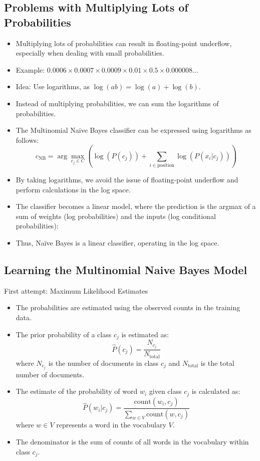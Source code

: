\documentclass{book}
\begin{document}
\subsection{Problems with Multiplying Lots of Probabilities}
\begin{itemize}
    \item Multiplying lots of probabilities can result in floating-point underflow, especially when dealing with small probabilities.
    \item Example: $0.0006 \times 0.0007 \times 0.0009 \times 0.01 \times 0.5 \times 0.000008 \ldots$
    \item Idea: Use logarithms, as $\log(ab) = \log(a) + \log(b)$.
    \item Instead of multiplying probabilities, we can sum the logarithms of probabilities.
    \item The Multinomial Naive Bayes classifier can be expressed using logarithms as follows:
    \[
    c_{\text{NB}} = \arg\max_{c_j \in C} \left(\log(P(c_j)) + \sum_{i \in \text{position}} \log(P(x_i | c_j))\right)
    \]
    \item By taking logarithms, we avoid the issue of floating-point underflow and perform calculations in the log space.
     \item The classifier becomes a linear model, where the prediction is the argmax of a sum of weights (log probabilities) and the inputs (log conditional probabilities):
    \item Thus, Naïve Bayes is a linear classifier, operating in the log space.
    
    
\end{itemize}

\subsection{Learning the Multinomial Naive Bayes Model}
First attempt: Maximum Likelihood Estimates
\begin{itemize}
    \item The probabilities are estimated using the observed counts in the training data.
    \item The prior probability of a class $c_j$ is estimated as:
    \[
    \hat{P}(c_j) = \frac{N_{c_j}}{N_{\text{total}}}
    \]
    where $N_{c_j}$ is the number of documents in class $c_j$ and $N_{\text{total}}$ is the total number of documents.
    \item The estimate of the probability of word $w_i$ given class $c_j$ is calculated as:
    \[
    \hat{P}(w_i | c_j) = \frac{{\text{{count}}(w_i, c_j)}}{\sum_{w\in V}{\text{{count}}(w, c_j)}}
    \]
    where $w \in V$ represents a word in the vocabulary $V$.
    \item The denominator is the sum of counts of all words in the vocabulary within class $c_j$.
\end{itemize}
\end{document}
